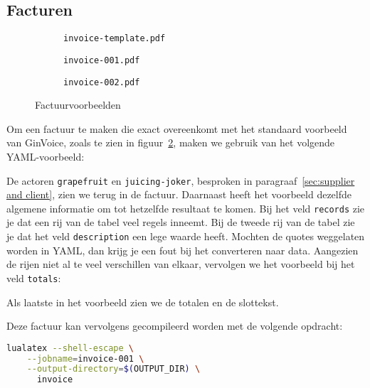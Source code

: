 \subsection{Facturen}
\begin{figure}[!ht]
    \begin{subfigure}{.32\linewidth}
        \caption{\texttt{invoice-template.pdf}}\label{fig:result alt}
    \end{subfigure}\hfill
    \begin{subfigure}{.32\linewidth}
        \caption{\texttt{invoice-001.pdf}}\label{fig:result 1}
    \end{subfigure}\hfill
    \begin{subfigure}{.32\linewidth}
        \caption{\texttt{invoice-002.pdf}}\label{fig:result 2}
    \end{subfigure}
    \caption{Factuurvoorbeelden}\label{fig:pdfs}
\end{figure}
\begin{multicols}{2}
    \noindent
    Om een factuur te maken die exact overeenkomt met het standaard voorbeeld van GinVoice, zoals te zien in figuur~\ref{fig:result 1}, maken we gebruik van het volgende YAML-voorbeeld:
    
    De actoren \texttt{grapefruit} en \texttt{juicing-joker}, besproken in paragraaf~\ref{sec:supplier and client}, zien we terug in de factuur.
    Daarnaast heeft het voorbeeld dezelfde algemene informatie om tot hetzelfde resultaat te komen.
    Bij het veld \texttt{records} zie je dat een rij van de tabel veel regels inneemt.
    Bij de tweede rij van de tabel zie je dat het veld \texttt{description} een lege waarde heeft.
    \columnbreak
    Mochten de quotes weggelaten worden in YAML, dan krijg je een fout bij het converteren naar data.
    Aangezien de rijen niet al te veel verschillen van elkaar, vervolgen we het voorbeeld bij het veld \texttt{totals}:
    
    Als laatste in het voorbeeld zien we de totalen en de slottekst.

    Deze factuur kan vervolgens gecompileerd worden met de volgende opdracht:
    \begin{lstlisting}[language=bash]
lualatex --shell-escape \
    --jobname=invoice-001 \
    --output-directory=$(OUTPUT_DIR) \
      invoice
    \end{lstlisting}
\end{multicols}
\twocolumn

